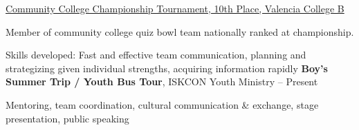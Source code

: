 \documentclass[letterpaper,MMMyyyy,nonstopmode]{simpleresumecv}
\begin{document}
\begin{Body}
\BulletItem
\href{https://www.naqt.com/stats/tournament/standings.jsp?tournament_id=7403}
{Community College Championship Tournament,
10th Place,
Valencia College B}
\hfill
{}
\begin{Detail}
\Item
Member of community college quiz bowl team nationally ranked at championship.
\end{Detail}
\BulletItem
Skills developed: Fast and effective team communication, planning and strategizing given individual strengths, acquiring information rapidly 
\Entry
\Entry
\textbf{Boy's Summer Trip / Youth Bus Tour}, ISKCON Youth Ministry
\hfill {} -- Present
\begin{Detail}
\SubBulletItem
Mentoring, team coordination, cultural communication \& exchange, stage presentation, public speaking
\end{Detail}

\end{Body}
\iffalse
    \BulletItem
    \href{https://valenciacollege.edu/students/deanslist/fall2016.cfm}
	{President's List,
    Fall 2016,
    Valencia College}
    \hfill
    Fall \DatestampY{2016} %
    \begin{Detail}
    \Item
    For attaining a semester GPA of 4.00 with 6 or more credit hours while dual-enrolled in high school.
    \end{Detail}
\fi
\iffalse
    \Section
    {Languages}
    {Languages}
    {PDF:Languages}
    
    
    \BulletItem
    C++
    \begin{Detail}
    \SubBulletItem
    Experience with Pointers, Objects, and Classes. Worked on projects with single and doubly Linked List classes. 
    \end{Detail}
    
\fi




\end{document}

